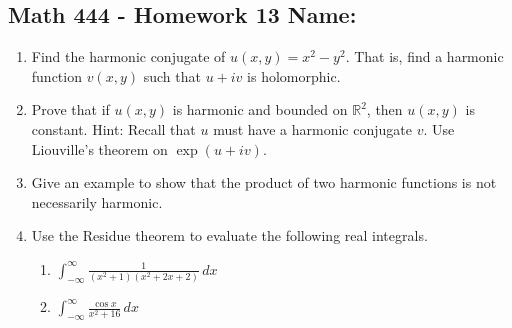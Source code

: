 \documentclass[11pt]{article}
\newcommand{\ds}{\displaystyle}
\newcommand{\R}{\mathbb{R}}
\begin{document}
\pagestyle{empty}
\subsection*{Math 444 - Homework 13 \hfill Name: \underline{\hspace*{2in}}}
\noindent
\begin{enumerate}
\item Find the harmonic conjugate of $u(x,y) = x^2 - y^2$.  That is, find a harmonic function $v(x,y)$ such that $u+iv$ is holomorphic.  
\vfill


\item Prove that if $u(x,y)$ is harmonic and bounded on $\R^2$, then $u(x,y)$ is constant.  Hint: Recall that $u$ must have a harmonic conjugate $v$.  Use Liouville's theorem on $\exp(u+iv)$.   
\vfill

\item Give an example to show that the product of two harmonic functions is not necessarily harmonic.  
\vfill 

\item Use the Residue theorem to evaluate the following real integrals. 
\begin{multicols}{2}
\begin{enumerate}
\item $\ds \int_{-\infty}^\infty \frac{1}{(x^2+1)(x^2 + 2x + 2)} \, dx$ 

\item $\ds \int_{-\infty}^\infty \frac{\cos x}{x^2 + 16} \, dx$
\end{enumerate}
\end{multicols}
\vfill

\end{enumerate}
\end{document}
